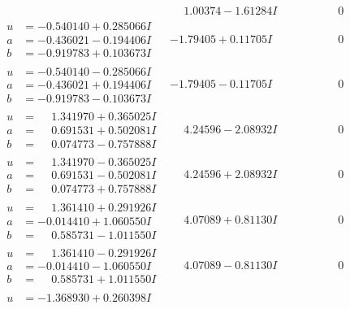 \documentclass[1p]{elsarticle_modified}
\theoremstyle{definition}
\begin{document}
$$\begin{array}{c|c|c}
 & \phantom{-}1.00374 - 1.61284 I & \phantom{-0.000000 } 0 \\ \hline\begin{aligned}
u &= -0.540140 + 0.285066 I \\
a &= -0.436021 - 0.194406 I \\
b &= -0.919783 + 0.103673 I\end{aligned}
 & -1.79405 + 0.11705 I & \phantom{-0.000000 } 0 \\ \hline\begin{aligned}
u &= -0.540140 - 0.285066 I \\
a &= -0.436021 + 0.194406 I \\
b &= -0.919783 - 0.103673 I\end{aligned}
 & -1.79405 - 0.11705 I & \phantom{-0.000000 } 0 \\ \hline\begin{aligned}
u &= \phantom{-}1.341970 + 0.365025 I \\
a &= \phantom{-}0.691531 + 0.502081 I \\
b &= \phantom{-}0.074773 - 0.757888 I\end{aligned}
 & \phantom{-}4.24596 - 2.08932 I & \phantom{-0.000000 } 0 \\ \hline\begin{aligned}
u &= \phantom{-}1.341970 - 0.365025 I \\
a &= \phantom{-}0.691531 - 0.502081 I \\
b &= \phantom{-}0.074773 + 0.757888 I\end{aligned}
 & \phantom{-}4.24596 + 2.08932 I & \phantom{-0.000000 } 0 \\ \hline\begin{aligned}
u &= \phantom{-}1.361410 + 0.291926 I \\
a &= -0.014410 + 1.060550 I \\
b &= \phantom{-}0.585731 - 1.011550 I\end{aligned}
 & \phantom{-}4.07089 + 0.81130 I & \phantom{-0.000000 } 0 \\ \hline\begin{aligned}
u &= \phantom{-}1.361410 - 0.291926 I \\
a &= -0.014410 - 1.060550 I \\
b &= \phantom{-}0.585731 + 1.011550 I\end{aligned}
 & \phantom{-}4.07089 - 0.81130 I & \phantom{-0.000000 } 0 \\ \hline\begin{aligned}
u &= -1.368930 + 0.260398 I \\

\end{aligned}
\end{array}$$
\end{document}
